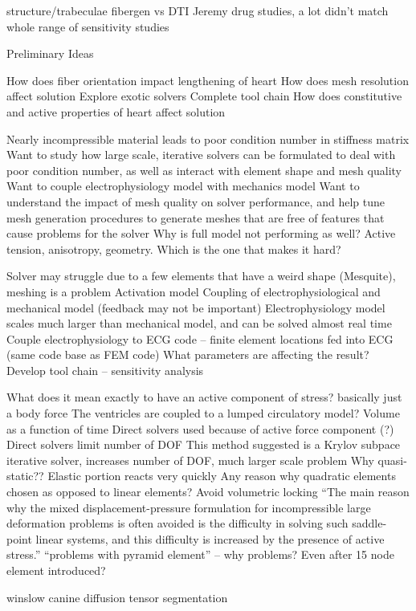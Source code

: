 structure/trabeculae
fibergen vs DTI
Jeremy drug studies, a lot didn’t match
whole range of sensitivity studies



­Preliminary Ideas

How does fiber orientation impact lengthening of heart
How does mesh resolution affect solution
Explore exotic solvers
Complete tool chain
How does constitutive and active properties of heart affect solution


Nearly incompressible material leads to poor condition number in stiffness matrix
Want to study how large scale, iterative solvers can be formulated to deal with poor condition number, as well as interact with element shape and mesh quality
Want to couple electrophysiology model with mechanics model
Want to understand the impact of mesh quality on solver performance, and help tune mesh generation procedures to generate meshes that are free of features that cause problems for the solver
Why is full model not performing as well? Active tension, anisotropy, geometry. Which is the one that makes it hard?


Solver may struggle due to a few elements that have a weird shape (Mesquite), meshing is a problem
Activation model
Coupling of electrophysiological and mechanical model (feedback may not be important)
Electrophysiology model scales much larger than mechanical model, and can be solved almost real time
Couple electrophysiology to ECG code – finite element locations fed into ECG (same code base as FEM code)
What parameters are affecting the result?
Develop tool chain – sensitivity analysis





What does it mean exactly to have an active component of stress? basically just a body force
The ventricles are coupled to a lumped circulatory model? Volume as a function of time
Direct solvers used because of active force component (?)
Direct solvers limit number of DOF
This method suggested is a Krylov subpace iterative solver, increases number of DOF, much larger scale problem
 Why quasi-static?? Elastic portion reacts very quickly
Any reason why quadratic elements chosen as opposed to linear elements? Avoid volumetric locking
“The main reason why the mixed displacement-pressure formulation for incompressible large deformation problems is often avoided is the di fficulty in solving such saddle-point linear systems, and this difficulty is increased by the presence of active stress.”
“problems with pyramid element” – why problems? Even after 15 node element introduced?


winslow canine diffusion tensor segmentation
